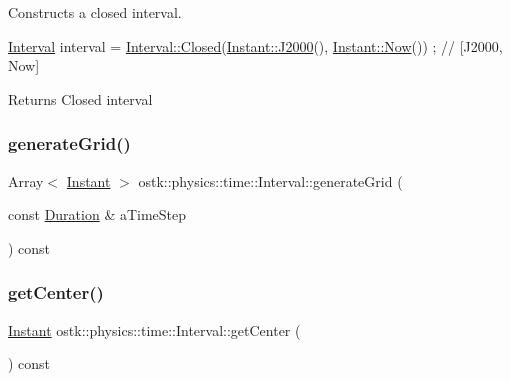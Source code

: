 Constructs a closed interval. 


\begin{DoxyCode}
\hyperlink{classostk_1_1physics_1_1time_1_1_interval_a62d60b1eb3c7c782d7c45e8b9c153b34}{Interval} interval = \hyperlink{classostk_1_1physics_1_1time_1_1_interval_aa8d39973df40ac95b27cc460e86e3aa7}{Interval::Closed}(\hyperlink{classostk_1_1physics_1_1time_1_1_instant_a3f84d0c2d0b140326d3b172b54e3ffff}{Instant::J2000}(), 
      \hyperlink{classostk_1_1physics_1_1time_1_1_instant_afbc9a9219aa94e8a828f5876ee68f42c}{Instant::Now}()) ; \textcolor{comment}{// [J2000, Now]}
\end{DoxyCode}


\begin{DoxyReturn}{Returns}
Closed interval 
\end{DoxyReturn}
\mbox{\label{classostk_1_1physics_1_1time_1_1_interval_ae50bd06e26fbee080424f7d202c6cdfc}} 
\subsubsection{\texorpdfstring{generate\+Grid()}{generateGrid()}}
{\footnotesize\ttfamily Array$<$ \hyperlink{classostk_1_1physics_1_1time_1_1_instant}{Instant} $>$ ostk\+::physics\+::time\+::\+Interval\+::generate\+Grid (\begin{DoxyParamCaption}\item[{const \hyperlink{classostk_1_1physics_1_1time_1_1_duration}{Duration} \&}]{a\+Time\+Step }\end{DoxyParamCaption}) const}

\mbox{\label{classostk_1_1physics_1_1time_1_1_interval_ab0abf8d0aaf5bb6181ddda58de5fe9a2}} 
\subsubsection{\texorpdfstring{get\+Center()}{getCenter()}}
{\footnotesize\ttfamily \hyperlink{classostk_1_1physics_1_1time_1_1_instant}{Instant} ostk\+::physics\+::time\+::\+Interval\+::get\+Center (\begin{DoxyParamCaption}{ }\end{DoxyParamCaption}) const}

